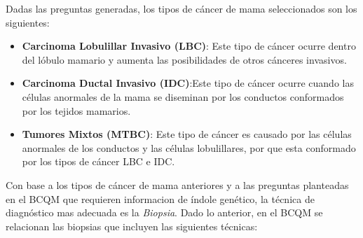 Dadas las preguntas generadas, los tipos de cáncer de mama seleccionados son los siguientes:
\begin{itemize}[label=\HandRight]
	\item \textbf{Carcinoma Lobulillar Invasivo (LBC)}:  Este tipo de cáncer ocurre dentro del lóbulo mamario y aumenta las posibilidades de otros cánceres invasivos. 
	\item \textbf{Carcinoma Ductal Invasivo (IDC)}:Este tipo de cáncer ocurre cuando las células anormales de la mama se diseminan por los conductos conformados por los tejidos mamarios.
	\item \textbf{Tumores Mixtos (MTBC)}: Este tipo de cáncer es causado por las células anormales de los conductos y las células lobulillares, por que esta conformado por los tipos de cáncer LBC e IDC.
\end{itemize}

Con base a los tipos de cáncer de mama anteriores y a las preguntas planteadas en el BCQM que requieren informacion de índole genético, la técnica de diagnóstico mas adecuada es la \textit{Biopsia}. Dado lo anterior, en el BCQM se relacionan las biopsias que incluyen las siguientes técnicas: 

